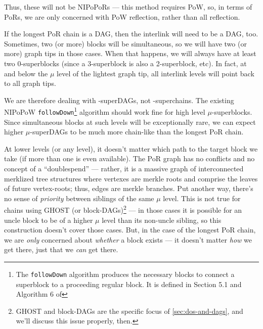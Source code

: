 Thus, these will not be NIPoPoRs --- this method requires PoW, so, in terms of PoRs, we are only concerned with PoW reflection, rather than all reflection.



\label{sec:nipopowrs-problem-dag-compatibility}

If the longest PoR chain is a DAG, then the interlink will need to be a DAG, too.
Sometimes, two (or more) blocks will be simultaneous, so we will have two (or more) graph tips in those cases.
When that happens, we will always have at least two 0-superblocks (since a 3-superblock is also a 2-superblock, etc).
In fact, at and below the $\mu$ level of the lightest graph tip, all interlink levels will point back to all graph tips.

We are therefore dealing with \mu-superDAGs, not \mu-superchains.
The existing NIPoPoW \texttt{followDown}\footnote{The \texttt{followDown} algorithm produces the necessary blocks to connect a superblock to a proceeding regular block. It is defined in Section 5.1 and Algorithm 6 of \citeNIPoPoWs{}} algorithm should work fine for high level $\mu$-superblocks.
Since simultaneous blocks at such levels will be exceptionally rare, we can expect higher $\mu$-superDAGs to be much more chain-like than the longest PoR chain.

At lower levels (or any level), it doesn't matter which path to the target block we take (if more than one is even available).
The PoR graph has no conflicts and no concept of a ``doublespend'' --- rather, it is a massive graph of interconnected merklized tree structures where vertexes are merkle roots and comprise the leaves of future vertex-roots; thus, edges are merkle branches.
Put another way, there's no sense of \emph{priority} between siblings of the same $\mu$ level.
This is not true for chains using GHOST (or block-DAGs)\footnote{
    GHOST and block-DAGs are the specific focus of \autoref{sec:dos-and-dags}, and we'll discuss this issue properly, then.
} --- in those cases it is possible for an uncle block to be of a higher $\mu$ level than its non-uncle sibling, so this construction doesn't cover those cases.
But, in the case of the longest PoR chain, we are \emph{only} concerned about \emph{whether} a block exists --- it doesn't matter \emph{how} we get there, just that we \emph{can} get there.

